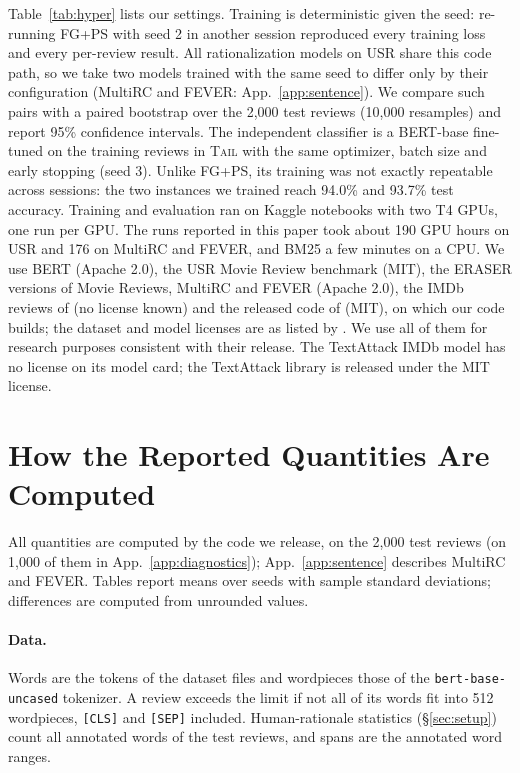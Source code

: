 \documentclass[11pt]{article}
\newcommand{\TAIL}{\textup{\textsc{Tail}}}
\begin{document}
Table~\ref{tab:hyper} lists our settings. Training is deterministic given the seed: re-running FG+PS with seed 2 in another session reproduced every training loss and every per-review result. All rationalization models on USR share this code path, so we take two models trained with the same seed to differ only by their configuration (MultiRC and FEVER: App.~\ref{app:sentence}). We compare such pairs with a paired bootstrap over the 2,000 test reviews (10,000 resamples) and report 95\% confidence intervals. The independent classifier is a BERT-base fine-tuned on the training reviews in \TAIL{} with the same optimizer, batch size and early stopping (seed 3). Unlike FG+PS, its training was not exactly repeatable across sessions: the two instances we trained reach 94.0\% and 93.7\% test accuracy. Training and evaluation ran on Kaggle notebooks with two T4 GPUs, one run per GPU. The runs reported in this paper took about 190 GPU hours on USR and 176 on MultiRC and FEVER, and BM25 a few minutes on a CPU. We use BERT (Apache 2.0), the USR Movie Review benchmark (MIT), the ERASER versions of Movie Reviews, MultiRC and FEVER (Apache 2.0), the IMDb reviews of \citet{maas-etal-2011-learning} (no license known) and the released code of \citet{storek-etal-2023-unsupervised} (MIT), on which our code builds; the dataset and model licenses are as listed by \citet{storek-etal-2023-unsupervised}. We use all of them for research purposes consistent with their release. The TextAttack IMDb model \citep{morris-etal-2020-textattack} has no license on its model card; the TextAttack library is released under the MIT license.

\section{How the Reported Quantities Are Computed}
\label{app:definitions}

All quantities are computed by the code we release, on the 2,000 test reviews (on 1,000 of them in App.~\ref{app:diagnostics}); App.~\ref{app:sentence} describes MultiRC and FEVER. Tables report means over seeds with sample standard deviations; differences are computed from unrounded values.

\paragraph{Data.} Words are the tokens of the dataset files and wordpieces those of the \texttt{bert-base-uncased} tokenizer. A review exceeds the limit if not all of its words fit into 512 wordpieces, \texttt{[CLS]} and \texttt{[SEP]} included. Human-rationale statistics (\S\ref{sec:setup}) count all annotated words of the test reviews, and spans are the annotated word ranges.
\end{document}
